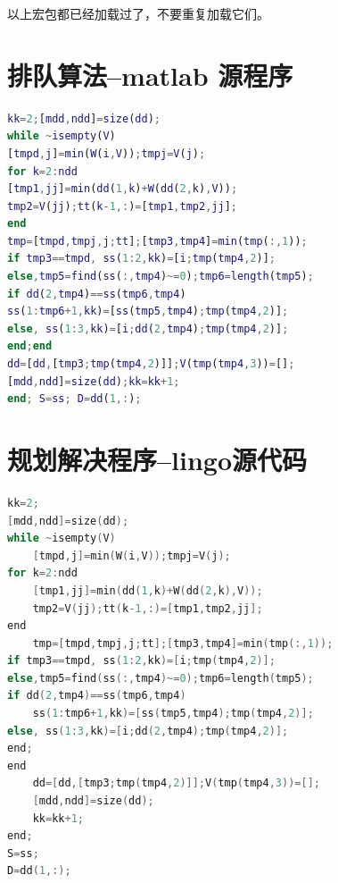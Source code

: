 \documentclass{cumcmthesis}
\begin{document}
\begin{appendices}
以上宏包都已经加载过了，不要重复加载它们。

\section{排队算法--matlab 源程序}

\begin{lstlisting}[language=matlab]
kk=2;[mdd,ndd]=size(dd);
while ~isempty(V)
[tmpd,j]=min(W(i,V));tmpj=V(j);
for k=2:ndd
[tmp1,jj]=min(dd(1,k)+W(dd(2,k),V));
tmp2=V(jj);tt(k-1,:)=[tmp1,tmp2,jj];
end
tmp=[tmpd,tmpj,j;tt];[tmp3,tmp4]=min(tmp(:,1));
if tmp3==tmpd, ss(1:2,kk)=[i;tmp(tmp4,2)];
else,tmp5=find(ss(:,tmp4)~=0);tmp6=length(tmp5);
if dd(2,tmp4)==ss(tmp6,tmp4)
ss(1:tmp6+1,kk)=[ss(tmp5,tmp4);tmp(tmp4,2)];
else, ss(1:3,kk)=[i;dd(2,tmp4);tmp(tmp4,2)];
end;end
dd=[dd,[tmp3;tmp(tmp4,2)]];V(tmp(tmp4,3))=[];
[mdd,ndd]=size(dd);kk=kk+1;
end; S=ss; D=dd(1,:);
 \end{lstlisting}

 \section{规划解决程序--lingo源代码}

\begin{lstlisting}[language=c]
kk=2;
[mdd,ndd]=size(dd);
while ~isempty(V)
    [tmpd,j]=min(W(i,V));tmpj=V(j);
for k=2:ndd
    [tmp1,jj]=min(dd(1,k)+W(dd(2,k),V));
    tmp2=V(jj);tt(k-1,:)=[tmp1,tmp2,jj];
end
    tmp=[tmpd,tmpj,j;tt];[tmp3,tmp4]=min(tmp(:,1));
if tmp3==tmpd, ss(1:2,kk)=[i;tmp(tmp4,2)];
else,tmp5=find(ss(:,tmp4)~=0);tmp6=length(tmp5);
if dd(2,tmp4)==ss(tmp6,tmp4)
    ss(1:tmp6+1,kk)=[ss(tmp5,tmp4);tmp(tmp4,2)];
else, ss(1:3,kk)=[i;dd(2,tmp4);tmp(tmp4,2)];
end;
end
    dd=[dd,[tmp3;tmp(tmp4,2)]];V(tmp(tmp4,3))=[];
    [mdd,ndd]=size(dd);
    kk=kk+1;
end;
S=ss;
D=dd(1,:);
 \end{lstlisting}
\end{appendices}
\end{document}
